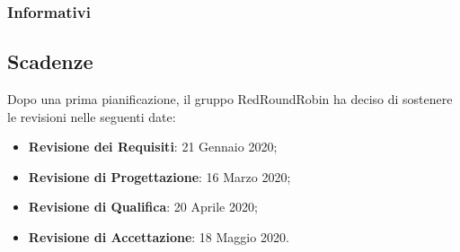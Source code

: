 		\subsubsection{Informativi}
			

	\subsection{Scadenze}
	\label{riferimento_scadenze}
		Dopo una prima pianificazione, il gruppo RedRoundRobin ha deciso di sostenere le revisioni nelle seguenti date:
		\begin{itemize}
			\item \textbf{Revisione dei Requisiti}: 21 Gennaio 2020;
			\item \textbf{Revisione di Progettazione}: 16 Marzo 2020;
			\item \textbf{Revisione di Qualifica}: 20 Aprile 2020;
			\item \textbf{Revisione di Accettazione}: 18 Maggio 2020.
		\end{itemize}
